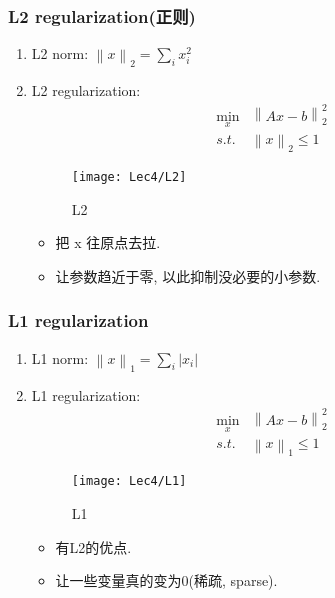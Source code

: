     \subsubsection{L2 regularization(正则)} 
    \begin{enumerate}
        \item L2 norm: $\left\| x \right\|_2=\sum_i x_i^2$
        \item L2 regularization:
        \begin{align*}
            \min_x &\left\| Ax-b \right\|_2^2\\
            s.t.&\left\| x \right\|_2\le 1
        \end{align*}

        \begin{figure}[H]
            \centering
            \texttt{[image: Lec4/L2]}
            \caption{L2}
        \end{figure}
        \begin{itemize}
            \item 把 x 往原点去拉. 
            \item 让参数趋近于零, 以此抑制没必要的小参数. 
        \end{itemize}
    \end{enumerate}

    \subsubsection{L1 regularization}
    \begin{enumerate}
        \item L1 norm: $\left\| x \right\|_1=\sum_i \left|x_i\right|$
        \item L1 regularization:
        \begin{align*}
            \min_x &\left\| Ax-b \right\|_2^2\\
            s.t.&\left\| x \right\|_1\le 1
        \end{align*}

        \begin{figure}[H]
            \centering
            \texttt{[image: Lec4/L1]}
            \caption{L1}
        \end{figure}

        \begin{itemize}
            \item 有L2的优点.
            \item 让一些变量真的变为0(稀疏, sparse).
        \end{itemize}
    \end{enumerate}

